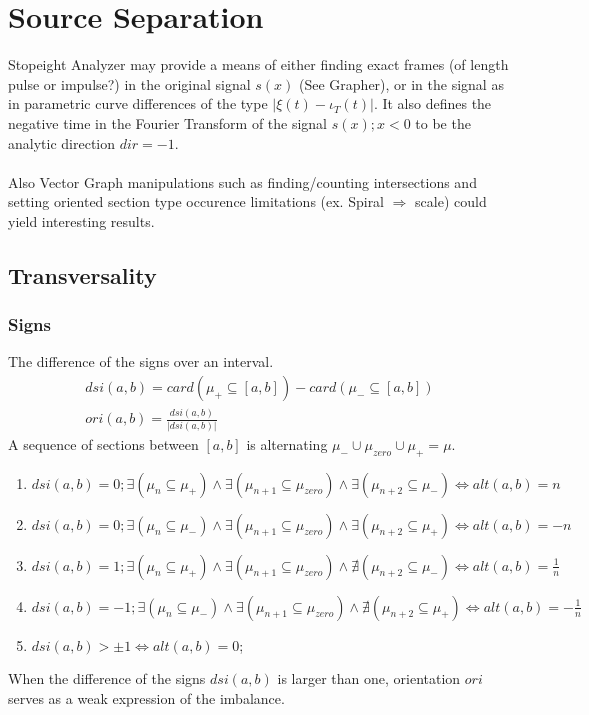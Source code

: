 \documentclass{report}
\begin{document}
\chapter{Source Separation}
Stopeight Analyzer may provide a means of either finding exact frames (of length pulse or impulse?) in the original signal $s(x)$ (See Grapher), or in the signal as in parametric curve differences of the type $\lvert \xi(t)-\iota_{T}(t) \rvert$. It also defines the negative time in the Fourier Transform of the signal $s(x);x<0$  to be the analytic direction $dir=-1$.\\\\
Also Vector Graph manipulations such as finding/counting intersections and setting oriented section type occurence limitations (ex. Spiral $\Rightarrow$ scale) could yield interesting results.

\section{Transversality}

\subsection{Signs}
The difference of the signs over an interval.
\begin{align}
dsi(a,b) = card(\mu_{+}\subseteq [a,b])-card(\mu_{-} \subseteq [a,b])\\
ori(a,b) = \frac{dsi(a,b)}{\lvert dsi(a,b) \rvert}
\end{align}
A sequence of sections between $[a,b]$ is alternating $\mu_{-}\cup \mu_{zero}\cup\mu_{+}=\mu$.
\begin{enumerate}
\item $dsi(a,b)= 0; \exists(\mu_{n}\subseteq \mu_{+}) \land \exists(\mu_{n+1}\subseteq \mu_{zero}) \land \exists(\mu_{n+2}\subseteq \mu_{-}) \Leftrightarrow alt(a,b)=n$
\item $dsi(a,b)= 0; \exists(\mu_{n}\subseteq \mu_{-}) \land \exists(\mu_{n+1}\subseteq \mu_{zero}) \land \exists(\mu_{n+2}\subseteq \mu_{+}) \Leftrightarrow alt(a,b)=-n$
\item $dsi(a,b)= 1; \exists(\mu_{n}\subseteq \mu_{+}) \land \exists(\mu_{n+1}\subseteq \mu_{zero}) \land \nexists(\mu_{n+2}\subseteq \mu_{-}) \Leftrightarrow alt(a,b)=\frac{1}{n}$
\item $dsi(a,b)= -1; \exists(\mu_{n}\subseteq \mu_{-}) \land \exists(\mu_{n+1}\subseteq \mu_{zero}) \land \nexists(\mu_{n+2}\subseteq \mu_{+}) \Leftrightarrow alt(a,b)=-\frac{1}{n}$
\item $dsi(a,b)> \pm 1\Leftrightarrow alt(a,b)=0$;
\end{enumerate}
When the difference of the signs $dsi(a,b)$ is larger than one, orientation $ori$ serves as a weak expression of the imbalance.
\end{document}
